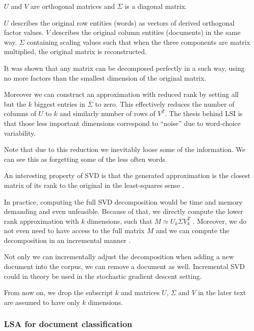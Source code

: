     $U$ and $V$ are orthogonal matrices and $\Sigma$ is a diagonal matrix.
    
    {}

    $U$ describes the original row entities (words) as vectors of derived orthogonal  factor values. 
    $V$ describes the original column entities (documents) in the same way.
    $\Sigma$ containing scaling values such that when the three components are matrix multiplied, the original matrix is reconstructed.

    It was shown that any matrix can be decomposed perfectly in a such way, using no more factors than the smallest dimension of the original matrix.
    
    Moreover we can construct an approximation with reduced rank by setting all but the $k$ biggest entries in $\Sigma$ to zero. 
    This effectively reduces the number of columns of $U$ to $k$ and similarly number of rows of $V^T$.
    The thesis behind LSI is that those less important dimensions correspond to “noise” due to word-choice variability.
    
    Note that due to this reduction we inevitably loose some of the information. 
    We can see this as forgetting some of the less often words.

    An interesting property of SVD is that the generated approximation is the closest matrix of its rank to the original in the least-squares sense \cite{berry1995using}.

    In practice, computing the full SVD decomposition would be time and memory demanding and even unfeasible.
    Because of that, we directly compute the lower rank approximation with $k$ dimensions,
    such that $M \simeq U_k \Sigma V_k^T$ \cite{halko2011finding}. %
    Moreover, we do not even need to have access to the full matrix $M$ and we can compute the decomposition in an incremental manner \cite{brand2006fast}. %
    
    Not only we can incrementally adjust the decomposition when adding a new document into the corpus, we can remove a document as well.
    Incremental SVD could in theory be used in the stochastic gradient descent setting.
    
    From now on, we drop the subscript $k$ and matrices $U$, $\Sigma$ and $V$ in the later text are assumed to have only $k$ dimensions.
    
    
    \subsubsection{LSA for document classification}
    
